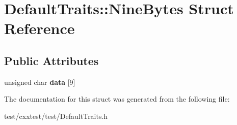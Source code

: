 \hypertarget{structDefaultTraits_1_1NineBytes}{\section{Default\-Traits\-:\-:Nine\-Bytes Struct Reference}
\label{structDefaultTraits_1_1NineBytes}
}
\subsection*{Public Attributes}
\begin{DoxyCompactItemize}
\item 
\hypertarget{structDefaultTraits_1_1NineBytes_a42b64b13798a9a1ea720218a5398c9e3}{unsigned char {\bfseries data} \mbox{[}9\mbox{]}}\label{structDefaultTraits_1_1NineBytes_a42b64b13798a9a1ea720218a5398c9e3}

\end{DoxyCompactItemize}


The documentation for this struct was generated from the following file\-:\begin{DoxyCompactItemize}
\item 
test/cxxtest/test/Default\-Traits.\-h\end{DoxyCompactItemize}
